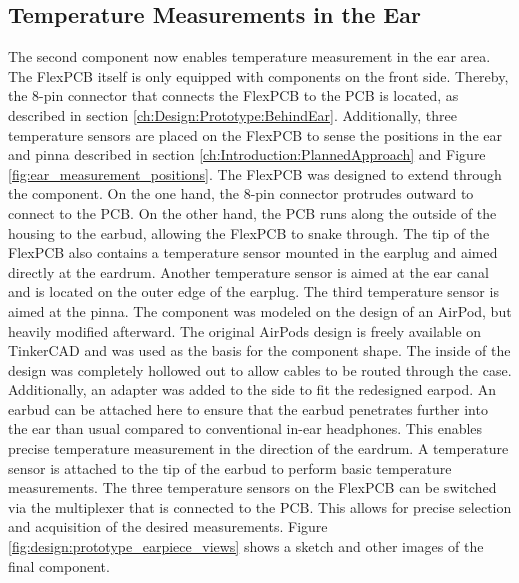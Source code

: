 
\subsection{Temperature Measurements in the Ear}
\label{ch:Design:Prototype:Earpiece}

The second component now enables temperature measurement in the ear area. The FlexPCB itself is only equipped with components on the front side. Thereby, the 8-pin connector that connects the FlexPCB to the PCB is located, as described in section \ref{ch:Design:Prototype:BehindEar}.
Additionally, three temperature sensors are placed on the FlexPCB to sense the positions in the ear and pinna described in section \ref{ch:Introduction:PlannedApproach} and Figure \ref{fig:ear_measurement_positions}.
The FlexPCB was designed to extend through the component. On the one hand, the 8-pin connector protrudes outward to connect to the PCB. 
On the other hand, the PCB runs along the outside of the housing to the earbud, allowing the FlexPCB to snake through. 
The tip of the FlexPCB also contains a temperature sensor mounted in the earplug and aimed directly at the eardrum. 
Another temperature sensor is aimed at the ear canal and is located on the outer edge of the earplug. The third temperature sensor is aimed at the pinna.
The component was modeled on the design of an AirPod, but heavily modified afterward. 
The original AirPods design is freely available on TinkerCAD and was used as the basis for the component shape. 
The inside of the design was completely hollowed out to allow cables to be routed through the case. Additionally, an adapter was added to the side to fit the redesigned earpod. 
An earbud can be attached here to ensure that the earbud penetrates further into the ear than usual compared to conventional in-ear headphones. 
This enables precise temperature measurement in the direction of the eardrum. A temperature sensor is attached to the tip of the earbud to perform basic temperature measurements.
The three temperature sensors on the FlexPCB can be switched via the multiplexer that is connected to the PCB. 
This allows for precise selection and acquisition of the desired measurements. Figure \ref{fig:design:prototype_earpiece_views} shows a sketch and other images of the final component.

